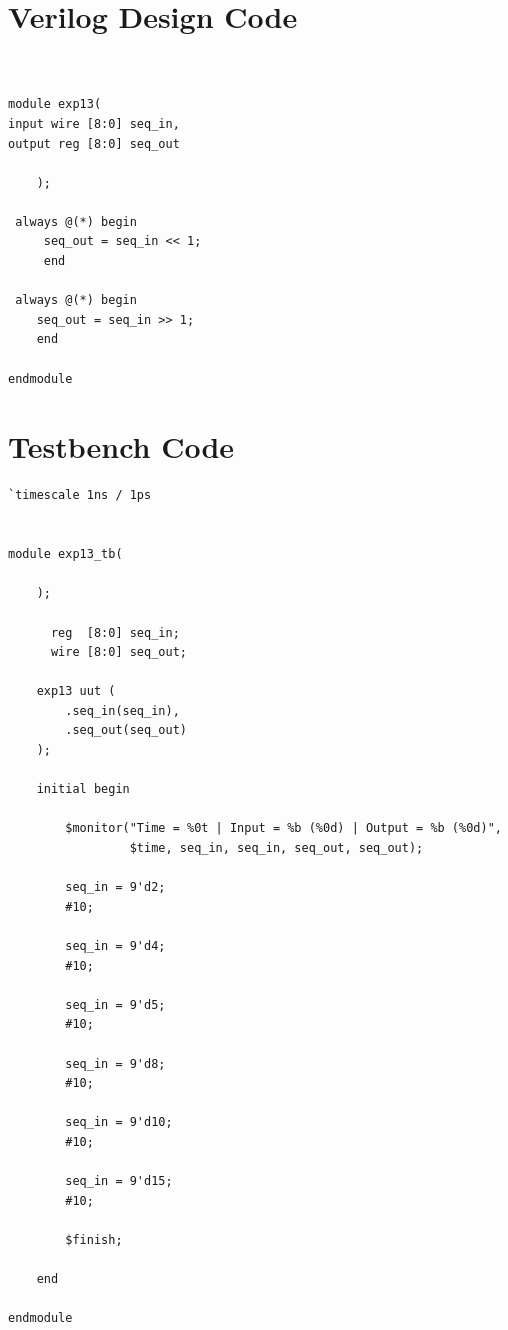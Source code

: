 \documentclass[12pt,a4paper]{report}
\begin{document}
\section{Verilog Design Code}

\begin{verilogbox}
\begin{lstlisting}


module exp13(
input wire [8:0] seq_in,
output reg [8:0] seq_out

    );
    
 always @(*) begin
     seq_out = seq_in << 1;
     end
     
 always @(*) begin 
    seq_out = seq_in >> 1;
    end
     
endmodule

\end{lstlisting}
\end{verilogbox}

\section{Testbench Code}

\begin{verilogbox}
\begin{lstlisting}
`timescale 1ns / 1ps


module exp13_tb(

    );
    
      reg  [8:0] seq_in;
      wire [8:0] seq_out;

    exp13 uut (
        .seq_in(seq_in),
        .seq_out(seq_out)
    );

    initial begin

        $monitor("Time = %0t | Input = %b (%0d) | Output = %b (%0d)",
                 $time, seq_in, seq_in, seq_out, seq_out);

        seq_in = 9'd2;
        #10;

        seq_in = 9'd4;
        #10;

        seq_in = 9'd5;
        #10;

        seq_in = 9'd8;
        #10;

        seq_in = 9'd10;
        #10;

        seq_in = 9'd15;
        #10;

        $finish;

    end

endmodule
\end{lstlisting}
\end{verilogbox}
\end{document}
